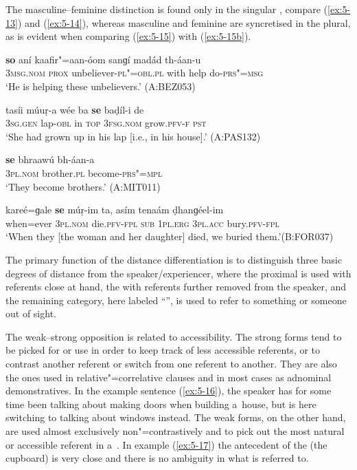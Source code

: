 The masculine--feminine  distinction is found only in the singular , compare (\ref{ex:5-13}) and (\ref{ex:5-14}), whereas masculine and feminine are syncretised in the plural, as is evident when comparing (\ref{ex:5-15}) with (\ref{ex:5-15b}). 


\begin{exe}
\ex
\label{ex:5-13}
\gll \textbf{so} aní kaafir"=aan-óom sanɡí madád th-áan-u \\
\textsc{3msg}.\textsc{nom} \textsc{prox} unbeliever-\textsc{pl"=obl.pl} with help do-\textsc{prs"=msg}\\
\glt `He is helping these unbelievers.' (A:BEZ053)

\ex
\label{ex:5-14}
\gll tasíi múuṛ-a wée ba \textbf{se} baḍíl-i de \\
\textsc{3sg}.\textsc{gen} lap-\textsc{obl} in \textsc{top} \textsc{3fsg}.\textsc{nom}
grow.\textsc{pfv-f} \textsc{pst}\\
\glt `She had grown up in his lap [i.e., in his house].' (A:PAS132)

\ex
\label{ex:5-15}
\gll \textbf{se} bhraawú bh-áan-a\\
\textsc{3pl}.\textsc{nom} brother.\textsc{pl} become-\textsc{prs"=mpl}\\
\glt `They become brothers.' (A:MIT011)

\ex
\label{ex:5-15b}
\gll kareé=ɡale \textbf{se} múṛ-im ta, asím  tenaám ḍhanɡéel-im\\
when=ever \textsc{3pl.nom} die.\textsc{pfv}-\textsc{fpl} \textsc{sub} \textsc{1pl.erg} \textsc{3pl.acc} bury.\textsc{pfv}-\textsc{fpl} \\
\glt `When they [the woman and her daughter] died, we buried them.'\newline (B:FOR037)
\end{exe}


The primary function of the distance differentiation is to distinguish three basic degrees of distance from the speaker/experiencer, where the proximal is used with referents close at hand, the  with referents further removed from the speaker, and the remaining category, here labeled ``'', is used to refer to something or someone out of sight. 


The weak--strong opposition is related to accessibility. The strong forms tend to be picked for  or  use in order to keep track of less accessible  referents, or to contrast another referent or switch from one referent to another. They are also the ones used in relative"=correlative clauses and in most cases as adnominal demonstratives. In the example sentence (\ref{ex:5-16}), the speaker has for some time been talking about making doors when building a~house, but is here switching to talking about windows instead. The weak forms, on the other hand, are used almost exclusively non"=contrastively and to pick out the most natural or accessible referent in a~. In example (\ref{ex:5-17}) the antecedent of the  (the cupboard) is very close and there is no ambiguity in what is referred to.


